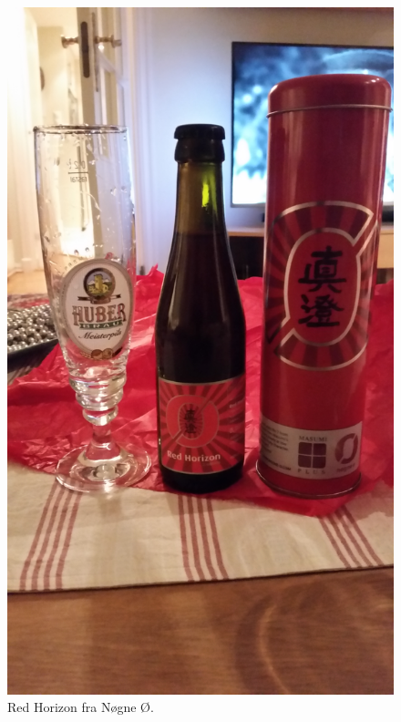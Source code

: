 \documentclass[12pt,a4paper,oneside,norsk]{article}
\begin{document}
\begin{figure} [H] 
\centering
\includegraphics[scale=0.04, angle=-90]{Bilder/Ol/redHorizon.jpg}
\caption{Red Horizon fra Nøgne Ø.}
\end{figure}
\end{document}
